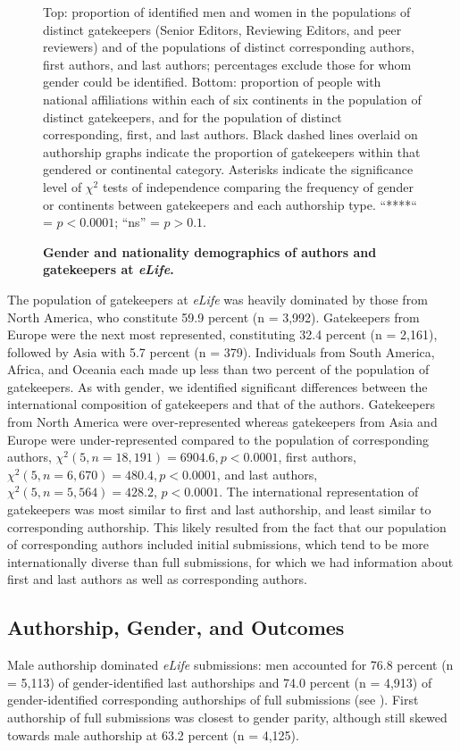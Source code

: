 \documentclass[10pt,letterpaper]{article}
\begin{document}
\begin{figure}[!h]
\caption{\bf Gender and nationality demographics of authors and gatekeepers at \textit{eLife}.}
Top: proportion of identified men and women in the populations of distinct gatekeepers (Senior Editors, Reviewing Editors, and peer reviewers) and of the populations of distinct corresponding authors, first authors, and last authors; percentages exclude those for whom gender could be identified. Bottom: proportion of people with national affiliations within each of six continents in the population of distinct gatekeepers, and for the population of distinct corresponding, first, and last authors. Black dashed lines overlaid on authorship graphs indicate the proportion of gatekeepers within that gendered or continental category. Asterisks indicate the significance level of $\chi^{2}$ tests of independence comparing the frequency of gender or continents between gatekeepers and each authorship type. “****“ = $p < 0.0001$; “ns” = $p > 0.1$.
\label{fig3}
\end{figure}

The population of gatekeepers at \textit{eLife} was heavily dominated by those from North America, who constitute 59.9 percent (n = 3,992). Gatekeepers from Europe were the next most represented, constituting 32.4 percent (n = 2,161), followed by Asia with 5.7 percent (n = 379). Individuals from South America, Africa, and Oceania each made up less than two percent of the population of gatekeepers. As with gender, we identified significant differences between the international composition of gatekeepers and that of the authors. Gatekeepers from North America were over-represented whereas gatekeepers from Asia and Europe were under-represented compared to the population of corresponding authors, $\chi^{2} (5, n = 18,191) = 6904.6, p < 0.0001$, first authors, $\chi^{2} (5, n = 6,670) = 480.4, p < 0.0001$, and last authors, $\chi^{2} (5, n = 5,564) = 428.2$, $p < 0.0001$. The international representation of gatekeepers was most similar to first and last authorship, and least similar to corresponding authorship. This likely resulted from the fact that our population of corresponding authors included initial submissions, which tend to be more internationally diverse than full submissions, for which we had information about first and last authors as well as corresponding authors. 

\subsection*{Authorship, Gender, and Outcomes}
Male authorship dominated \textit{eLife} submissions: men accounted for 76.8 percent (n = 5,113) of gender-identified last authorships and 74.0 percent (n = 4,913) of gender-identified corresponding authorships of full submissions (see ). First authorship of full submissions was closest to gender parity, although still skewed towards male authorship at 63.2 percent (n = 4,125).
\end{document}
